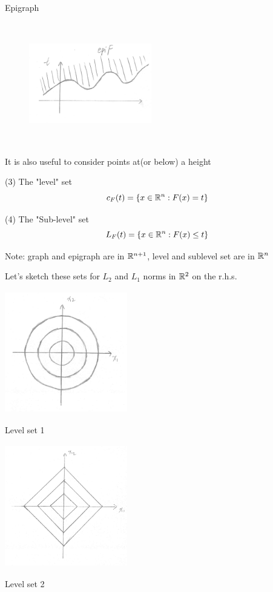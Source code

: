 Epigraph
\begin{figure}
	\centering
	\includegraphics[width=2.1in,height=2.1in]{figures/ch02/p47-2.jpg}
\end{figure}



It is also useful to consider points at(or below) a height

(3) The "level" set
$$c_{F}(t)=\{x\in\mathbb{R}^{n}:F(x)=t\}$$

(4) The "Sub-level" set
$$L_{F}(t)=\{x\in\mathbb{R}^{n}:F(x)\leq t\}$$

Note: graph and epigraph are in $\mathbb{R}^{n+1}$, level and sublevel set are in $\mathbb{R}^{n}$


\vspace{0.5cm}
Let's sketch these sets for $L_{2}$ and $L_{1}$ norms in $\mathbb{R}^{2}$ on the r.h.s.

\newpage

\begin{marginfigure}
	\centering
	\includegraphics[width=2.1in,height=2.1in]{figures/ch02/p48-5.jpg}
		\caption{Level set 1} 
\end{marginfigure}

\begin{marginfigure}
	\centering
	\includegraphics[width=2.1in,height=2.1in]{figures/ch02/p48-6.jpg}
	\caption{Level set 2} 
\end{marginfigure}

